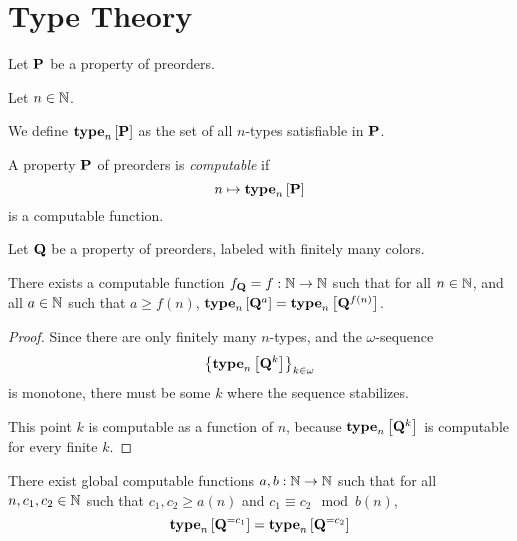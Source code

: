 \section{Type Theory}
\begin{definition}
    Let $\mathbf{P}$ be a property of preorders.

    Let $n \in \mathbb{N}$.

    We define $\mathbf{type}_{n} \left[ {\mathbf{P}} \right]$ as the set of all
    $n$-types satisfiable in $\mathbf{P}$.
\end{definition}

\begin{definition}
    A property $\mathbf{P}$ of preorders is \emph{computable} if
    \[n \mapsto \mathbf{type}_{n} \left[ {\mathbf{P}} \right]\] is a computable function.
\end{definition}

\begin{lemma}\label{f-lemma}
    Let $\mathbf{Q}$ be a property of preorders,
    labeled with finitely many colors.

    There exists a computable function $f_{\mathbf{Q}} = f: \mathbb{N} \to \mathbb{N}$ such that
    for all $n \in \mathbb{N}$, and all $a \in \mathbb{N}$ such that $a \ge f(n)$,
    $\mathbf{type}_{n} \left[ {\mathbf{Q}^{a}} \right] = \mathbf{type}_{n} \left[ {\mathbf{Q}^{f(n)}} \right]$.
\end{lemma}

\begin{proof}
    Since there are only finitely many $n$-types,
    and the $\omega$-sequence \[\left\{ {\mathbf{type}_{n} \left[ {\mathbf{Q}^{k}} \right]} \right\}_{k \in \omega}\]
    is monotone,
    there must be some $k$ where the sequence stabilizes.

    This point $k$ is computable as a function of $n$, because
    $\mathbf{type}_{n} \left[ {\mathbf{Q}^{k}} \right]$ is computable for every finite $k$.
\end{proof}

\begin{lemma}\label{ab-lemma}
    There exist global computable functions $a, b : \mathbb{N} \to \mathbb{N}$ such that
    for all $n, c_1, c_2 \in \mathbb{N}$ such that $c_1, c_2 \ge a(n)$ and $c_1 \equiv c_2 \mod b(n)$,
    \[\mathbf{type}_{n} \left[ {\mathbf{Q}^{= c_1}} \right] = \mathbf{type}_{n} \left[ {\mathbf{Q}^{= c_2}} \right]\]
\end{lemma}

